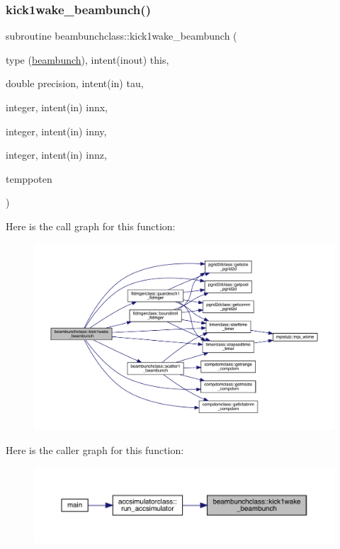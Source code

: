 \subsubsection{\texorpdfstring{kick1wake\_beambunch()}{kick1wake\_beambunch()}}
{\footnotesize\ttfamily subroutine beambunchclass\+::kick1wake\+\_\+beambunch (\begin{DoxyParamCaption}\item[{type (\mbox{\hyperlink{namespacebeambunchclass_structbeambunchclass_1_1beambunch}{beambunch}}), intent(inout)}]{this,  }\item[{double precision, intent(in)}]{tau,  }\item[{integer, intent(in)}]{innx,  }\item[{integer, intent(in)}]{inny,  }\item[{integer, intent(in)}]{innz,  }\item[{}]{temppoten }\end{DoxyParamCaption})}

Here is the call graph for this function\+:\nopagebreak
\begin{figure}[H]
\begin{center}
\leavevmode
\includegraphics[width=350pt]{namespacebeambunchclass_a02f7f46438747a0fb811de64b1ed95aa_cgraph}
\end{center}
\end{figure}
Here is the caller graph for this function\+:\nopagebreak
\begin{figure}[H]
\begin{center}
\leavevmode
\includegraphics[width=350pt]{namespacebeambunchclass_a02f7f46438747a0fb811de64b1ed95aa_icgraph}
\end{center}
\end{figure}
\mbox{\label{namespacebeambunchclass_a398a8735bfae34f0d7a9337c8e5ec621}} 
